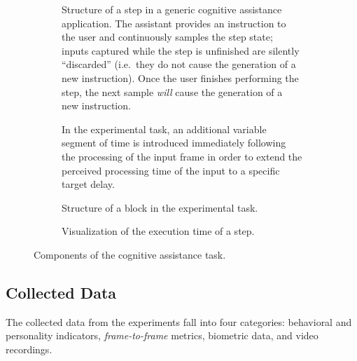 \begin{figure}[h]
  \centering
  \begin{subfigure}[t]{.49\textwidth}
    \centering
    \caption{Structure of a step in a generic cognitive assistance application. 
    The assistant provides an instruction to the user and continuously samples the step state; inputs captured while the step is unfinished are silently ``discarded'' (i.e.\ they do not cause the generation of a new instruction).
    Once the user finishes performing the step, the next sample \emph{will} cause the generation of a new instruction.
    }
    \label{fig:cogassist:step}
  \end{subfigure}%
  \hfill%
  \begin{subfigure}[t]{.49\textwidth}
    \centering
    \caption{In the experimental task, an additional variable segment of time is introduced immediately following the processing of the input frame in order to extend the perceived processing time of the input to a specific target delay.}%
    \label{fig:cogassist:step:delay}
  \end{subfigure}
  \medskip%
  \begin{subfigure}[t]{.49\textwidth}
    \centering
    \caption{Structure of a block in the experimental task.}%
    \label{fig:cogassist:block}
  \end{subfigure}%
  \hfill%
  \begin{subfigure}[t]{.49\textwidth}
    \centering
    \caption{Visualization of the execution time of a step.}%
    \label{fig:exectime:diagram}
  \end{subfigure}%
  \caption{Components of the cognitive assistance task.}
\end{figure}

\subsection{Collected Data}

The collected data from the experiments fall into four categories: behavioral and personality indicators, \emph{frame-to-frame} metrics, biometric data, and video recordings.


